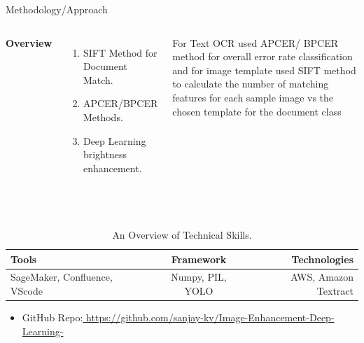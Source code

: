\documentclass[aspectratio=169,xcolor=dvipsnames]{beamer}
\begin{document}
\begin{frame}{Methodology/Approach}
    \tableofcontents

    \begin{columns}[c] %

        \textbf{Overview}
        \begin{enumerate}
            \item SIFT Method for Document Match.
            \item APCER/BPCER Methods.
            \item Deep Learning brightness enhancement.
        \end{enumerate}

         For Text OCR used APCER/ BPCER method for overall error rate classification and for image template used SIFT method to calculate the number of matching features for each sample image vs the chosen template for the document class

    \end{columns}   \\
    
\begin{table}[h!]
  \begin{center}
    \caption{An Overview of Technical Skills.}
    \label{tab:table1}
    \begin{tabular}{|l|c|r|} %
      \hline
      \textbf{Tools } & \textbf{Framework} & \textbf{Technologies}\\
      
      \hline
      SageMaker, Confluence, VScode & Numpy, PIL, YOLO  & AWS, Amazon Textract  \\
      \hline
     
    \end{tabular}
  \end{center}
\end{table}   \newline
\begin{itemize}
      
    \item \alert{GitHub Repo:}\href{ https://github.com/sanjay-kv/Image-Enhancement-Deep-Learning-}{ https://github.com/sanjay-kv/Image-Enhancement-Deep-Learning-}
 
    \end{itemize}
\end{frame}
\end{document}
